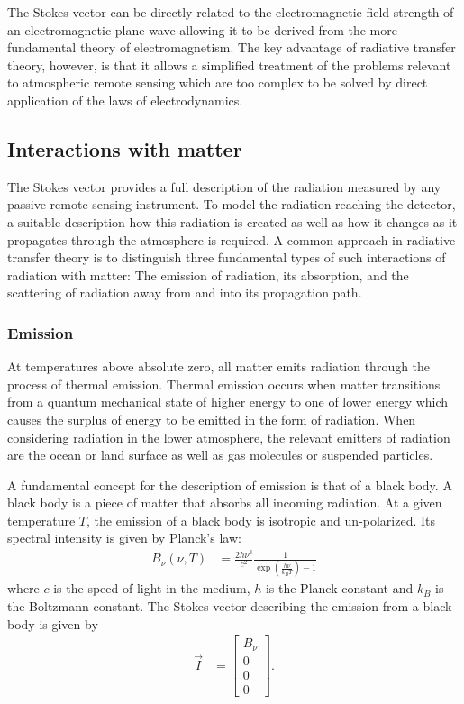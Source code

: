 The Stokes vector can be directly related to the
electromagnetic field strength of an electromagnetic plane wave allowing it to
be derived from the more fundamental theory of electromagnetism. The key
advantage of radiative transfer theory, however, is that it allows a simplified
treatment of the problems relevant to atmospheric remote sensing which are too
complex to be solved by direct application of the laws of electrodynamics.

\subsection{Interactions with matter}

The Stokes vector provides a full description of the radiation measured by any
passive remote sensing instrument. To model the radiation reaching the detector,
a suitable description how this radiation is created as well as how it changes
as it propagates through the atmosphere is required. A common approach in
radiative transfer theory is to distinguish three fundamental types of such
interactions of radiation with matter: The emission of radiation, its
absorption, and the scattering of radiation away from and into its propagation
path.

\subsubsection{Emission}

At temperatures above absolute zero, all matter emits radiation through the
process of thermal emission. Thermal emission occurs when matter transitions
from a quantum mechanical state of higher energy to one of lower energy which
causes the surplus of energy to be emitted in the form of radiation. When
considering radiation in the lower atmosphere, the relevant emitters of
radiation are the ocean or land surface as well as gas molecules or suspended
particles.

A fundamental concept for the description of emission is that of a black body.
A black body is a piece of matter that absorbs all incoming radiation. At a
given temperature $T$, the emission of a black body is isotropic and un-polarized.
Its spectral intensity is given by Planck's law:
\begin{align}
  B_\nu(\nu, T) &= \frac{2h\nu^3}{c^2}\frac{1}{\exp ( \frac{h\nu}{k_B T} )- 1}
\end{align}
where $c$ is the speed of light in the medium, $h$ is the Planck constant and
$k_B$ is the Boltzmann constant. The Stokes vector describing the emission from
a black body is given by
\begin{align}
  \vec{I} &= \left [ \begin{array}{c}B_\nu \\ 0 \\ 0 \\ 0\end{array} \right ].
\end{align}

